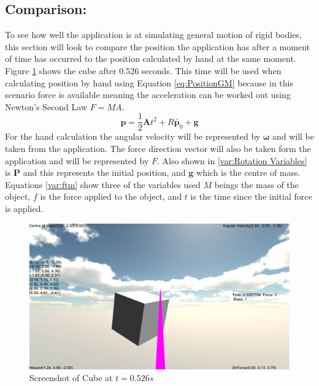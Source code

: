 \subsection{Comparison:}\label{sc:Comp}
To see how well the application is at simulating general motion of rigid bodies, this section will look to compare the position the application has after a moment of time has occurred to the position calculated by hand at the same moment.
Figure \ref{fig:ScreenShotSingle} shows the cube after 0.526 seconds.
This time will be used when calculating position by hand using Equation \ref{eq:PositionGM} because in this scenario force is available meaning the acceleration can be worked out using Newton's Second Law $F=MA$.
\begin{equation}\label{eq:PositionGM}
\mathbf{p}=\frac{1}{2}\mathbf{A}t^{2}+{R}\tilde{\mathbf{p}_{0}}+\mathbf{g}
\end{equation}
For the hand calculation the angular velocity will be represented by $\boldsymbol{\omega}$ and will be taken from the application.
The force direction vector will also be taken form the application and will be represented by $F$.
Also shown in \ref{var:Rotation Variables} is $\mathbf{P}$ and this represents the initial position, and $\mathbf{g}$ which is the centre of mass.
Equations \ref{var:ftm} show three of the variables used $M$ beings the mass of the object, $f$ is the force applied to the object, and $t$ is the time since the initial force is applied. 
\begin{figure}[h!]
	\centering
	\includegraphics[width=\textwidth]{images/Screenshot2.PNG}
	\caption{Screenshot of Cube at $t = 0.526 s$}
	\label{fig:ScreenShotSingle}
\end{figure}
